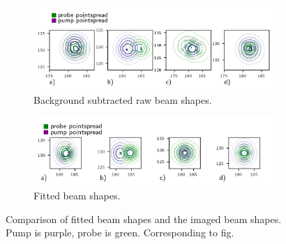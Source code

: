 \documentclass[twoside,openright]{scrreprt}
\begin{document}
\begin{figure}[hbp]
\centering
\begin{subfigure}[t]{\linewidth}
\centering
\includegraphics[scale=1]{images/CompensationTestRaw.png}
\caption{Background subtracted raw beam shapes.}
\end{subfigure}
\begin{subfigure}[t]{\linewidth}
\centering
\includegraphics[scale=1]{images/CompensationTestFitted.png}
\caption{Fitted beam shapes.}
\end{subfigure}
\caption{Comparison of fitted beam shapes and the imaged beam shapes. Pump is purple, probe is green. Corresponding to fig. \label{fig:rawVsFittedBeam}}
\end{figure}
\end{document}
